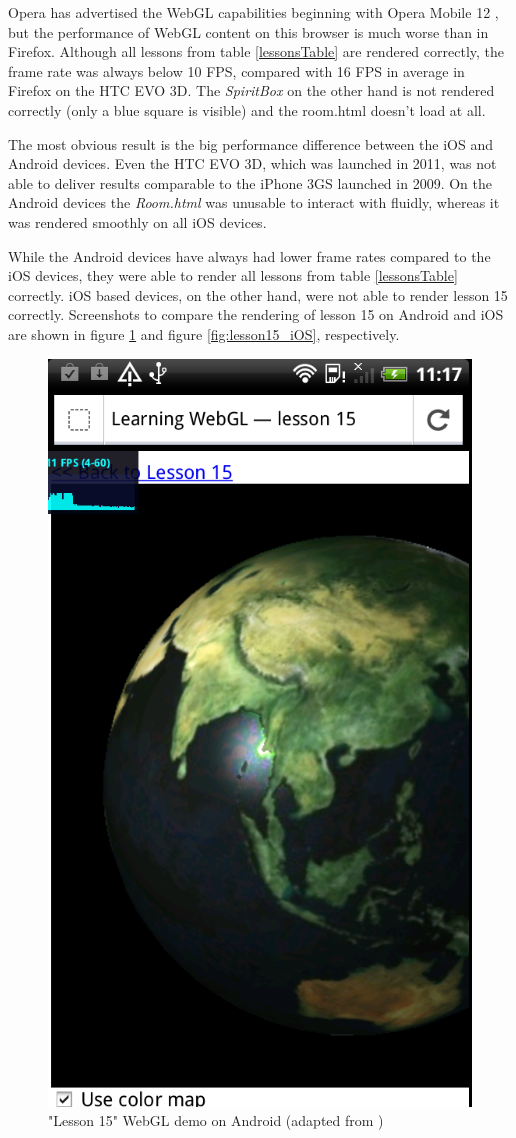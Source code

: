 \documentclass[12pt,journal,compsoc]{IEEEtran}
\begin{document}
Opera has advertised the WebGL capabilities beginning with Opera Mobile 12 \cite{opera12}, but the performance of WebGL content on this browser is much worse than in Firefox. Although all lessons from table \ref{lessonsTable} are rendered correctly, the frame rate was always below 10 FPS, compared with 16 FPS in average in Firefox on the HTC EVO 3D. The \textit{SpiritBox} on the other hand is not rendered correctly (only a blue square is visible) and the room.html doesn’t load at all.

The most obvious result is the big performance difference between the iOS and Android devices. Even the HTC EVO 3D, which was launched in 2011, was not able to deliver results comparable to the iPhone 3GS launched in 2009. On the Android devices the \textit{Room.html} was unusable to interact with fluidly, whereas it was rendered smoothly on all iOS devices. 

While the Android devices have always had lower frame rates compared to the iOS devices, they were able to render all lessons from table \ref{lessonsTable} correctly. iOS based  devices, on the other hand, were not able to render lesson 15 correctly. Screenshots to compare the rendering of lesson 15 on Android and iOS are shown in figure \ref{fig:lesson15_Android} and figure \ref{fig:lesson15_iOS}, respectively. 

\begin{figure}[htb]
	\begin{center}
	\includegraphics[width=0.65\columnwidth]{grafiken/lesson15_Android}
      \caption{"Lesson 15" WebGL demo on Android (adapted from \cite{lesson15})}
      \label{fig:lesson15_Android}
    \end{center}
\end{figure}
\end{document}

